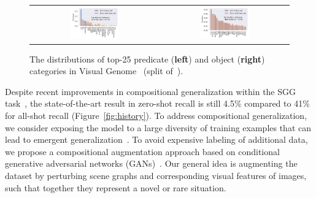 \begin{figure}[t]
\begin{scriptsize}
\setlength{\tabcolsep}{5pt}
\begin{center}
\begin{tabular}{cc}
	\includegraphics[width=0.4\textwidth]{rel_distr_test_VG_test_zs.pdf} & \includegraphics[width=0.4\textwidth]{obj_distr_test_VG_test_zs.pdf} \\
\end{tabular}
\end{center}
\end{scriptsize}
\vspace{-20pt}
\caption{ \small The distributions of top-25 predicate (\textbf{left}) and object (\textbf{right}) categories in Visual Genome~\citep{krishna2017visual} (split of~\citep{xu2017scene}).
}
\vspace{-12pt}
\label{fig:predicates}
\end{figure}

Despite recent improvements in compositional generalization within the SGG task~\citep{tang2020unbiased,knyazev2020graph,suhail2021energy}, the state-of-the-art result in zero-shot recall is still 4.5\% compared to 41\% for all-shot recall (Figure~\ref{fig:history}). 
To address compositional generalization, we consider exposing the model to a large diversity of training examples that can lead to emergent generalization~\citep{hill2019environmental,ravuri2019seeing}. To avoid expensive labeling of additional data, we propose a compositional augmentation approach based on conditional generative adversarial networks (GANs)~\citep{goodfellow2014generative,mirza2014conditional}. Our general idea is augmenting the dataset by perturbing scene graphs and corresponding visual features of images, such that together they represent a novel or rare situation. 


